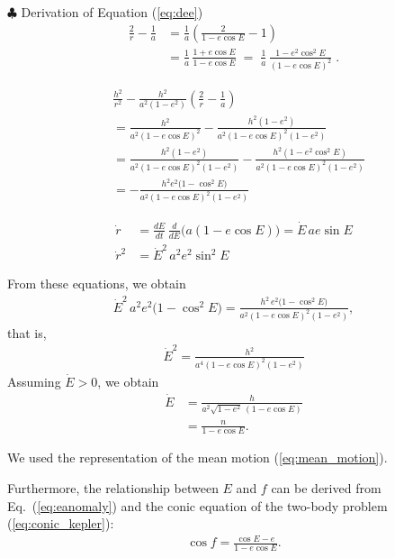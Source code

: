 \begin{itembox}{$\clubsuit$ Derivation of Equation (\ref{eq:dee})}
\footnotesize
\color{gray}
\begin{align}
  \frac{2}{r}-\frac{1}{a}
    &=\frac{1}{a}\!\left(\frac{2}{1-e\cos E}-1\right)     \nonumber \\
    &=\frac{1}{a}\,\frac{1+e\cos E}{1-e\cos E}
      \;=\;
      \frac{1}{a}\,
      \frac{1-e^{2}\cos^{2}E}{(1-e\cos E)^{2}}\;.
\end{align}

\begin{align}
 &\frac{h^{2}}{r^{2}}
 -\frac{h^{2}}{a^{2}(1-e^{2})}\!
  \left(\frac{2}{r}-\frac{1}{a}\right) \nonumber \\
 &= \frac{h^{2}}{a^{2}(1-e\cos E)^{2}}
    -\frac{h^{2}(1-e^{2})}{a^{2}(1-e\cos E)^{2}(1-e^{2})} \nonumber \\
 &=\frac{h^{2}(1-e^{2})}{a^{2}(1-e\cos E)^{2}(1-e^{2})} -\frac{h^{2}(1-e^{2}\cos^{2}E)}{a^{2}(1-e\cos E)^{2}(1-e^{2})}\nonumber \\
 &= -\frac{h^{2}e^{2}\bigl(1-\cos^{2}E\bigr)}
        {a^{2}(1-e\cos E)^{2}(1-e^{2})}
\end{align}

\begin{align}
     \dot r &=\frac{dE}{dt}\,
         \frac{d}{dE}\bigl(a(1-e\cos E)\bigr)
     =\dot E\,a e\sin E \\
  \dot r^{2}
    &=\dot E^{2}\,a^{2}e^{2}\sin^{2}E
\end{align}

From these equations, we obtain
\begin{align}
    \dot E^{2}\,a^{2}e^{2}\bigl(1-\cos^{2}E\bigr)
  =
  \frac{h^{2}\,e^{2}\bigl(1-\cos^{2}E\bigr)}
       {a^{2}(1-e\cos E)^{2}(1-e^{2})},
\end{align}
that is,
\begin{align}
    \dot E^{2}
   =\frac{h^{2}}
          {a^{4}(1-e\cos E)^{2}(1-e^{2})}
\end{align}
Assuming $\dot{E} > 0$, we obtain
\begin{align}
    \dot E
 &=\frac{h}{a^{2}\sqrt{1-e^{2}}\,(1-e\cos E)} \\
 & = \frac{n}{1 - e \cos{E}}.
\end{align}

We used the representation of the mean motion (\ref{eq:mean_motion}).
\end{itembox}
Furthermore, the relationship between $E$ and $f$ can be derived from Eq.~(\ref{eq:eanomaly}) and the conic equation of the two-body problem (\ref{eq:conic_kepler}):
\begin{align}
\label{eq:Efrel}
\cos{f} = \frac{\cos{E} - e}{1 - e \cos{E}} .
\end{align}


